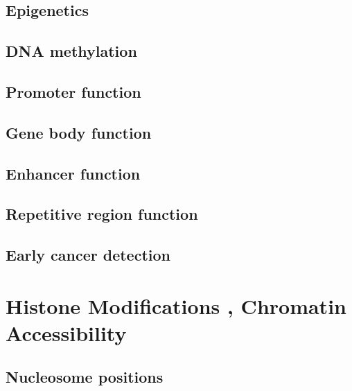 \documentclass[
]{book}
\begin{document}
\hypertarget{epigenetics}{%
\section{Epigenetics}\label{epigenetics}}

\hypertarget{dna-methylation}{%
\section{DNA methylation}\label{dna-methylation}}

\hypertarget{promoter-function}{%
\section{Promoter function}\label{promoter-function}}

\hypertarget{gene-body-function}{%
\section{Gene body function}\label{gene-body-function}}

\hypertarget{enhancer-function}{%
\section{Enhancer function}\label{enhancer-function}}

\hypertarget{repetitive-region-function}{%
\section{Repetitive region function}\label{repetitive-region-function}}

\hypertarget{early-cancer-detection}{%
\section{Early cancer detection}\label{early-cancer-detection}}

\hypertarget{hist}{%
\chapter{Histone Modifications , Chromatin Accessibility}\label{hist}}

\hypertarget{nucleosome-positions}{%
\section{Nucleosome positions}\label{nucleosome-positions}}
\end{document}
